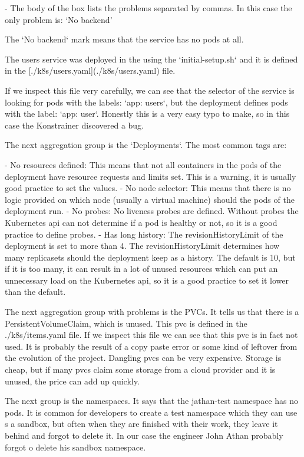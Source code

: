   - The body of the box lists the problems separated by commas. In this case the only problem is: `No backend'

The `No backend` mark means that the service has no pods at all.

The users service was deployed in the using the `initial-setup.sh` and it is defined in the [./k8s/users.yaml](./k8s/users.yaml) file.

If we inspect this file very carefully, we can see that the selector of the service is looking for pods with the labels: `app: users`, but the deployment defines pods with the label: `app: user`. Honestly this is a very easy typo to make, so in this case the Konstrainer discovered a bug.

The next aggregation group is the `Deployments`. The most common tags are:

- No resources defined: This means that not all containers in the pods of the deployment have resource requests and limits set. This is a warning, it is usually  good practice to set the values.
- No node selector: This means that there is no logic provided on which node (usually a virtual machine) should the pods of the deployment run.
- No probes: No liveness probes are defined. Without probes the Kubernetes api can not determine if a pod is healthy or not, so it is a good practice to define probes.
- Has long history: The revisionHistoryLimit of the deployment is set to more than 4. The revisionHistoryLimit determines how many replicasets should the deployment keep as a history. The default is 10, but if it is too many, it can result in a lot of unused resources which can put an unnecessary load on the Kubernetes api, so it is a good practice to set it lower than the default.

The next aggregation group with problems is the PVCs. It tells us that there is a PersistentVolumeClaim, which is unused. This pvc is defined in the ./k8s/items.yaml file. If we inspect this file we can see that this pvc is in fact not used. It is probably the result of a copy paste error or some kind of leftover from the evolution of the project. Dangling pvcs can be very expensive. Storage is cheap, but if many pvcs claim some storage from a cloud provider and it is unused, the price can add up quickly.

The next group is the namespaces. It says that the jathan-test namespace has no pods. It is common for developers to create a test namespace which they can use s a sandbox, but often when they are finished with their work, they leave it behind and forgot to delete it. In our case the engineer John Athan probably forgot o delete his sandbox namespace.

